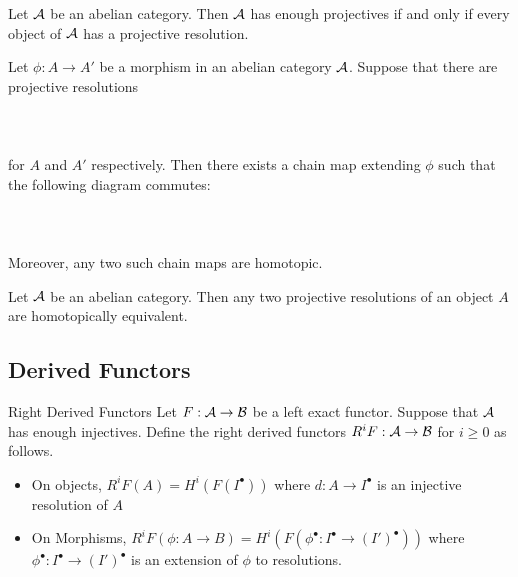 \documentclass[a4paper]{article}
\begin{document}
\begin{prp}{}{} Let $\mathcal{A}$ be an abelian category. Then $\mathcal{A}$ has enough projectives if and only if every object of $\mathcal{A}$ has a projective resolution. 
\end{prp}

\begin{prp}{}{} Let $\phi:A\to A'$ be a morphism in an abelian category $\mathcal{A}$. Suppose that there are projective resolutions \\~\\
\\~\\
for $A$ and $A'$ respectively. Then there exists a chain map extending $\phi$ such that the following diagram commutes: \\~\\
\\~\\
Moreover, any two such chain maps are homotopic. 
\end{prp}

\begin{lmm}{}{} Let $\mathcal{A}$ be an abelian category. Then any two projective resolutions of an object $A$ are homotopically equivalent. 
\end{lmm}

\subsection{Derived Functors}
\begin{defn}{Right Derived Functors}{} Let $F:\mathcal{A}\to\mathcal{B}$ be a left exact functor. Suppose that $\mathcal{A}$ has enough injectives. Define the right derived functors $R^iF:\mathcal{A}\to\mathcal{B}$ for $i\geq 0$ as follows. 
\begin{itemize}
\item On objects, $R^iF(A)=H^i(F(I^\bullet))$ where $d:A\to I^\bullet$ is an injective resolution of $A$
\item On Morphisms, $R^iF(\phi:A\to B)=H^i(F(\phi^\bullet:I^\bullet\to (I')^\bullet))$ where $\phi^\bullet:I^\bullet\to(I')^\bullet$ is an extension of $\phi$ to resolutions. 
\end{itemize}
\end{defn}
\end{document}
